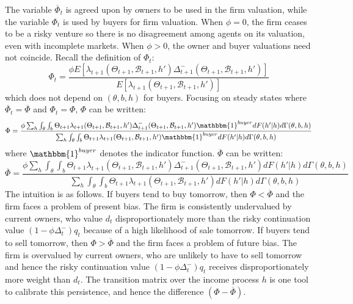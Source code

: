 \documentclass[12pt,letterpaper]{article}
\begin{document}
The variable $\overline{\Phi}_t$ is agreed upon by owners to be used in the firm valuation, while the variable $\Phi_t$ is used by buyers for firm valuation. When $\phi=0$, the firm ceases to be a risky venture so there is no disagreement among agents on its valuation, even with incomplete markets. When $\phi>0$, the owner and buyer valuations need not coincide. Recall the definition of $\Phi_t$:
\begin{equation*}
    \Phi_t=\frac{\phi E[\lambda_{t+1}(\Theta_{t+1},\mathcal{B}_{t+1},h')\Delta^-_{t+1}(\Theta_{t+1},\mathcal{B}_{t+1},h')]}{E[\lambda_{t+1}(\Theta_{t+1},\mathcal{B}_{t+1},h')]}
\end{equation*}which does not depend on $(\theta,b,h)$ for buyers. Focusing on steady states where $\overline{\Phi}_t=\overline{\Phi}$ and $\Phi_t=\Phi$, $\Phi$ can be written:
\begin{equation*}
    \Phi=\frac{\phi \sum_h\int_\theta\int_b\Theta_{t+1}\lambda_{t+1}(\Theta_{t+1},\mathcal{B}_{t+1},h')\Delta^-_{t+1}(\Theta_{t+1},\mathcal{B}_{t+1},h')\mathbbm{1}^{buyer}dF(h'|h)d\Gamma(\theta,b,h)}{\sum_h\int_\theta\int_b\Theta_{t+1}\lambda_{t+1}(\Theta_{t+1},\mathcal{B}_{t+1},h')\mathbbm{1}^{buyer}dF(h'|h)d\Gamma(\theta,b,h)}
\end{equation*}
where $\mathbbm{1}^{buyer}$ denotes the indicator function. $\overline{\Phi}$ can be written:
\begin{equation*}
    \overline{\Phi}=\frac{\phi \sum_h\int_\theta\int_b\Theta_{t+1}\lambda_{t+1}(\Theta_{t+1},\mathcal{B}_{t+1},h')\Delta^-_{t+1}(\Theta_{t+1},\mathcal{B}_{t+1},h')dF(h'|h)d\Gamma(\theta,b,h)}{\sum_h\int_\theta\int_b\Theta_{t+1}\lambda_{t+1}(\Theta_{t+1},\mathcal{B}_{t+1},h')dF(h'|h)d\Gamma(\theta,b,h)}
\end{equation*}
The intuition is as follows. If buyers tend to buy tomorrow, then $\Phi<\overline{\Phi}$ and the firm faces a problem of present bias. The firm is consistently undervalued by current owners, who value $d_t$ disproportionately more than the risky continuation value $(1-\phi\Delta_t^-)q_t$ because of a high likelihood of sale tomorrow. If buyers tend to sell tomorrow, then $\Phi>\overline{\Phi}$ and the firm faces a problem of future bias. The firm is overvalued by current owners, who are unlikely to have to sell tomorrow and hence the risky continuation value $(1-\phi\Delta_t^-)q_t$ receives disproportionately more weight than $d_t$. The transition matrix over the income process $h$ is one tool to calibrate this persistence, and hence the difference $(\Phi-\overline{\Phi})$.
\newpage
\end{document}
